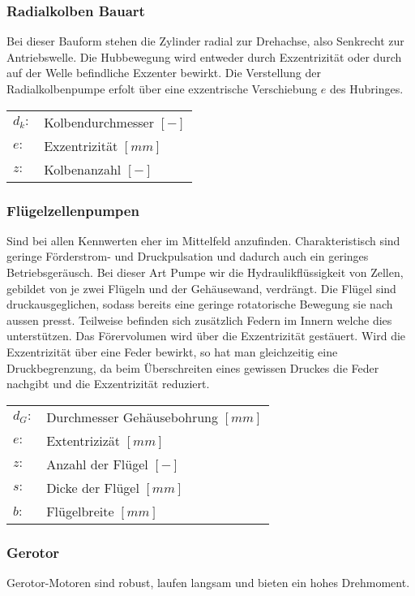 \subsubsection{Radialkolben Bauart}
Bei dieser Bauform stehen die Zylinder radial zur Drehachse, also Senkrecht zur Antriebswelle. Die Hubbewegung wird entweder durch Exzentrizität oder durch auf der Welle befindliche Exzenter bewirkt. Die Verstellung der Radialkolbenpumpe erfolt über eine exzentrische Verschiebung $e$ des Hubringes. 

\begin{tabular}{ll}
$d_k:$ & Kolbendurchmesser $[-]$ \\
$e:$ & Exzentrizität $[mm]$ \\
$z:$ & Kolbenanzahl $[-]$ 
\end{tabular}



\subsubsection{Flügelzellenpumpen}
Sind bei allen Kennwerten eher im Mittelfeld anzufinden.
Charakteristisch sind geringe Förderstrom- und Druckpulsation und dadurch auch ein geringes Betriebsgeräusch. Bei dieser Art Pumpe wir die Hydraulikflüssigkeit von Zellen, gebildet von je zwei Flügeln und der Gehäusewand, verdrängt. Die Flügel sind druckausgeglichen, sodass bereits eine geringe rotatorische Bewegung sie nach aussen presst. Teilweise befinden sich zusätzlich Federn im Innern welche dies unterstützen. Das Förervolumen wird über die Exzentrizität gestäuert. Wird die Exzentrizität über eine Feder bewirkt, so hat man gleichzeitig eine Druckbegrenzung, da beim Überschreiten eines gewissen Druckes die Feder nachgibt und die Exzentrizität reduziert. 

\begin{tabular}{ll}
$d_G:$ & Durchmesser Gehäusebohrung $[mm]$\\
$e:$ & Extentrizizät $[mm]$\\
$z:$ & Anzahl der Flügel $[-]$\\
$s:$ & Dicke der Flügel $[mm]$\\
$b:$ & Flügelbreite $[mm]$
\end{tabular}


\subsubsection{Gerotor}
Gerotor-Motoren sind robust, laufen langsam und bieten ein hohes Drehmoment. 


